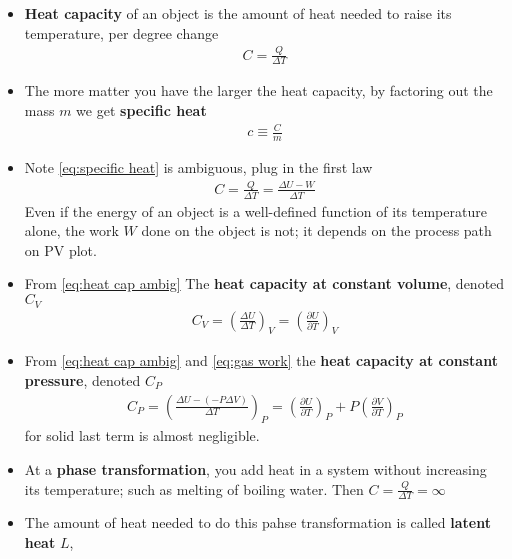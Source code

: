 \documentclass{book}
\begin{document}
\begin{itemize}
  \item \textbf{Heat capacity} of an object is the amount of heat needed to raise its temperature,
        per degree change
        \begin{align}
          \label{eq:heat capacity}
          C = \frac{Q}{\Delta{T}}
        \end{align}
  \item The more matter you have the larger the heat capacity, by factoring out the mass $m$
        we get \textbf{specific heat}
        \begin{align}
          \label{eq:specific heat}
          c \equiv \frac{C}{m}
        \end{align}
  \item Note \eqref{eq:specific heat} is ambiguous, plug in the first law
        \begin{align}
          \label{eq:heat cap ambig}
          C = \frac{Q}{\Delta{T}} = \frac{\Delta{U} - W}{\Delta{T}}
        \end{align}
        Even if the energy of an object is a well-defined function of its temperature alone,
        the work $W$ done on the object is not; it depends on the process path on PV plot.
  \item From \eqref{eq:heat cap ambig} The \textbf{heat capacity at constant volume}, denoted $C_{V}$
        \begin{align}
          \label{eq:heat cap v}
          C_{V} = \left( \frac{\Delta{U}}{\Delta{T}} \right) _{V} =
          \left( \frac{\partial U}{\partial T} \right)_{V}
        \end{align}
  \item From \eqref{eq:heat cap ambig} and \eqref{eq:gas work}
        the \textbf{heat capacity at constant pressure}, denoted $C_{P}$
        \begin{align}
          \label{eq:heat cap p}
          C_{P} = \left( \frac{\Delta{U} - (- P \Delta{V})}{\Delta{T}}  \right)_{P}
          = \left ( \frac{\partial U}{\partial T}  \right)_{P}
            + P \left ( \frac{\partial V}{\partial T}  \right)_{P}
        \end{align}
        for solid last term is almost negligible.
  \item At a \textbf{phase transformation}, you add heat in a system without increasing its temperature;
        such as melting of boiling water. Then $C = \frac{Q}{\Delta{T}} = \infty$
  \item The amount of heat needed to do this pahse transformation is called \textbf{latent heat} $L$,

\end{itemize}
\end{document}
